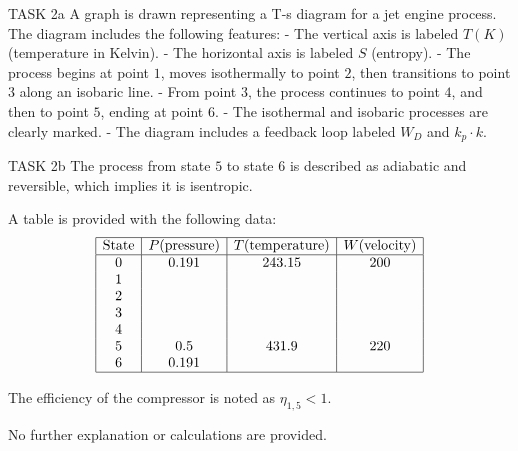 TASK 2a  
A graph is drawn representing a T-s diagram for a jet engine process. The diagram includes the following features:  
- The vertical axis is labeled \( T(K) \) (temperature in Kelvin).  
- The horizontal axis is labeled \( S \) (entropy).  
- The process begins at point \( 1 \), moves isothermally to point \( 2 \), then transitions to point \( 3 \) along an isobaric line.  
- From point \( 3 \), the process continues to point \( 4 \), and then to point \( 5 \), ending at point \( 6 \).  
- The isothermal and isobaric processes are clearly marked.  
- The diagram includes a feedback loop labeled \( W_D \) and \( k_{p} \cdot k \).  

TASK 2b  
The process from state \( 5 \) to state \( 6 \) is described as adiabatic and reversible, which implies it is isentropic.  

A table is provided with the following data:  
\[
\begin{array}{|c|c|c|c|}
\hline
\text{State} & P (\text{pressure}) & T (\text{temperature}) & W (\text{velocity}) \\
\hline
0 & 0.191 & 243.15 & 200 \\
1 & & & \\
2 & & & \\
3 & & & \\
4 & & & \\
5 & 0.5 & 431.9 & 220 \\
6 & 0.191 & & \\
\hline
\end{array}
\]

The efficiency of the compressor is noted as \( \eta_{1,5} < 1 \).  

No further explanation or calculations are provided.
